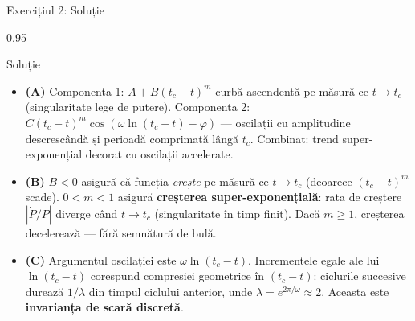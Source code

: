 \documentclass[9pt, aspectratio=169, t]{beamer}
\begin{document}
\begin{frame}{Exercițiul 2: Soluție}
    \begin{cminipage}{0.95\textwidth}
    \begin{exampleblock}{Soluție}
        {\small
        \begin{itemize}\setlength{\itemsep}{3pt}
            \item \textcolor{MainBlue}{\textbf{(A)}} Componenta 1: $A + B(t_c - t)^m$ curbă ascendentă pe măsură ce $t \to t_c$ (singularitate lege de putere). Componenta 2: $C(t_c - t)^m \cos(\omega \ln(t_c - t) - \varphi)$ --- oscilații cu amplitudine descrescândă și perioadă comprimată lângă $t_c$. Combinat: trend super-exponențial decorat cu oscilații accelerate.
            \item \textcolor{MainBlue}{\textbf{(B)}} $B < 0$ asigură că funcția \emph{crește} pe măsură ce $t \to t_c$ (deoarece $(t_c - t)^m$ scade). $0 < m < 1$ asigură \textbf{creșterea super-exponențială}: rata de creștere $|\dot{P}/P|$ diverge când $t \to t_c$ (singularitate în timp finit). Dacă $m \geq 1$, creșterea decelerează --- fără semnătură de bulă.
            \item \textcolor{MainBlue}{\textbf{(C)}} Argumentul oscilației este $\omega \ln(t_c - t)$. Incrementele egale ale lui $\ln(t_c - t)$ corespund compresiei geometrice în $(t_c - t)$: ciclurile succesive durează $1/\lambda$ din timpul ciclului anterior, unde $\lambda = e^{2\pi/\omega} \approx 2$. Aceasta este \textbf{invarianța de scară discretă}.
        \end{itemize}
        }
    \end{exampleblock}
    \end{cminipage}
\end{frame}
\end{document}
